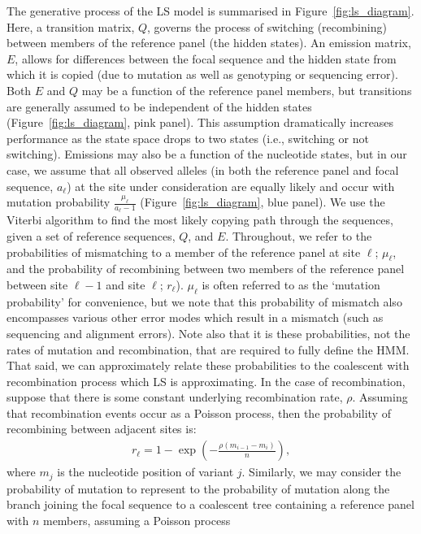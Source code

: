 \documentclass{article}
\begin{document}
The generative process of the LS model is summarised in
Figure~\ref{fig:ls_diagram}. Here, a transition matrix, $Q$, governs the
process of switching (recombining) between members of the reference panel (the
hidden states). An emission matrix, $E$, allows for differences between the
focal sequence and the hidden state from which it is copied (due to mutation as
well as genotyping or sequencing error). Both $E$ and $Q$ may be a function of the reference panel members,
but transitions are generally assumed to be independent of the hidden states (Figure~\ref{fig:ls_diagram}, pink panel).
This assumption dramatically increases performance as the state space drops to two states (i.e., switching or not switching).
Emissions may also be a function of the nucleotide states, but in our
case, we assume that all observed alleles (in both the reference panel and
focal sequence, $a_\ell$) at the site under consideration are equally likely and
occur with mutation probability $\frac{\mu_\ell}{a_\ell-1}$ (Figure~\ref{fig:ls_diagram}, blue panel).
We use the Viterbi algorithm
\citep{Viterbi1967-ol} to find the most likely copying path through the
sequences, given a set of reference sequences, $Q$, and $E$. Throughout, we refer to the probabilities of mismatching to a member of the reference panel at site $\ell$; $\mu_\ell$,
and the probability of recombining between two members of the reference panel between site $\ell-1$ and site $\ell$; $r_\ell$). $\mu_\ell$ is often referred to as the
`mutation probability' for convenience, but we note that this probability of
mismatch also encompasses various other error modes which result in a mismatch
(such as sequencing and alignment errors). Note also that it is these probabilities,
not the rates of mutation and recombination, that are required to fully define the HMM.
That said, we can approximately relate these probabilities to the coalescent with recombination process which LS is approximating. In the case of recombination,
suppose that there is some constant underlying recombination rate, $\rho$.
Assuming that recombination events occur as a Poisson process,
then the probability of recombining between adjacent sites is:
\begin{align*}
    r_\ell = 1 - \exp\left(-\frac{\rho\left(m_{i-1} - m_{i}\right)}{n}\right),
\end{align*}
where $m_j$ is the nucleotide position of variant $j$. Similarly, we may consider the probability of mutation to represent to the
probability of mutation along the branch joining the focal sequence to a coalescent
tree containing a reference panel with $n$ members, assuming a Poisson process
\end{document}
